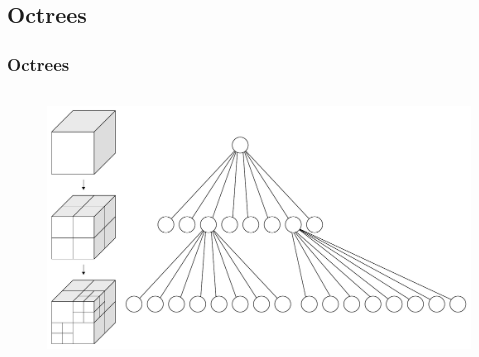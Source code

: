 \subsection{Octrees}

\begin{frame}
\frametitle{Octrees}
\begin{columns}[c]




\begin{figure}
\centering
\includegraphics[width=\textwidth]{../Presentation/Images/Attribute/Octree/Octree2.pdf}
\end{figure}


\end{columns}
\end{frame}
